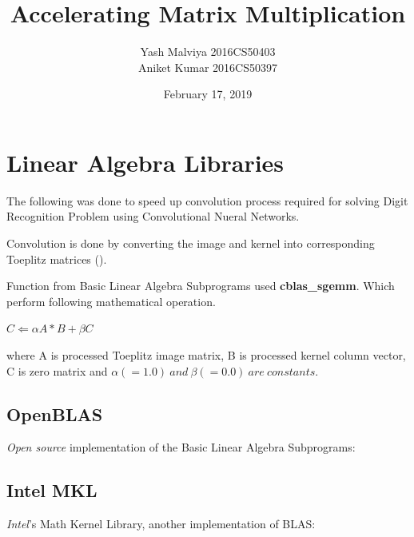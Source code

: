 \documentclass{article}
\author{Yash Malviya 2016CS50403 \\ Aniket Kumar 2016CS50397}
\title{Accelerating Matrix Multiplication}
\date{February 17, 2019}
\begin{document}
\maketitle

\section{Linear Algebra Libraries}

The following was done to speed up convolution process 
required for solving Digit Recognition Problem using 
Convolutional Nueral Networks. 

Convolution is done by converting the image and kernel 
into corresponding Toeplitz matrices
(\textcite{wiki:toepliz}).

Function from Basic Linear Algebra Subprograms used 
\textbf{cblas\_sgemm}. Which perform following 
mathematical operation.

\begin{math}
    C \Leftarrow \alpha A*B + \beta C
\end{math}

where A is processed Toeplitz image matrix,
B is processed kernel column vector, 
C is zero matrix and 
\begin{math}
    \alpha(=1.0)\ and\ \beta(=0.0)\ are\ constants.
\end{math}

\subsection{OpenBLAS}

\emph{Open source} implementation of the 
Basic Linear Algebra Subprograms: \textcite{OpenBLAS:wiki} 

\subsection{Intel MKL}

\emph{Intel}'s Math Kernel Library, another 
implementation of BLAS: \textcite{IntelMKL:doc}
\end{document}
